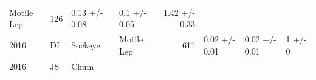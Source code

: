 \documentclass[fleqn,10pt]{wlpeerj} %
\begin{document}
\begin{longtable}[]{@{}llllrlll@{}}
\begin{minipage}[t]{0.11\columnwidth}
Motile Lep\strut
\end{minipage} & \begin{minipage}[t]{0.04\columnwidth}\raggedleft\strut
126\strut
\end{minipage} & \begin{minipage}[t]{0.14\columnwidth}\raggedright\strut
0.13 +/- 0.08\strut
\end{minipage} & \begin{minipage}[t]{0.14\columnwidth}\raggedright\strut
0.1 +/- 0.05\strut
\end{minipage} & \begin{minipage}[t]{0.14\columnwidth}\raggedright\strut
1.42 +/- 0.33\strut
\end{minipage}\tabularnewline
\begin{minipage}[t]{0.09\columnwidth}\raggedright\strut
2016\strut
\end{minipage} & \begin{minipage}[t]{0.06\columnwidth}\raggedright\strut
DI\strut
\end{minipage} & \begin{minipage}[t]{0.06\columnwidth}\raggedright\strut
Sockeye\strut
\end{minipage} & \begin{minipage}[t]{0.11\columnwidth}\raggedright\strut
Motile Lep\strut
\end{minipage} & \begin{minipage}[t]{0.04\columnwidth}\raggedleft\strut
611\strut
\end{minipage} & \begin{minipage}[t]{0.14\columnwidth}\raggedright\strut
0.02 +/- 0.01\strut
\end{minipage} & \begin{minipage}[t]{0.14\columnwidth}\raggedright\strut
0.02 +/- 0.01\strut
\end{minipage} & \begin{minipage}[t]{0.14\columnwidth}\raggedright\strut
1 +/- 0\strut
\end{minipage}\tabularnewline
\begin{minipage}[t]{0.09\columnwidth}\raggedright\strut
2016\strut
\end{minipage} & \begin{minipage}[t]{0.06\columnwidth}\raggedright\strut
JS\strut
\end{minipage} & \begin{minipage}[t]{0.06\columnwidth}\raggedright\strut
Chum\strut
\end{minipage} & \begin{minipage}[t]{0.11\columnwidth}\raggedright\strut

\end{minipage}
\end{longtable}
\end{document}
